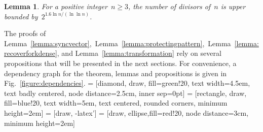 \documentclass[10pt,a4paper,onecolumn]{IEEEtran}
\newtheorem{lemma}{Lemma}
\newcommand{\1}{\mathbbold{1}}
\begin{document}
\begin{lemma}\label{lemma:numberofdivisors}
For a positive integer~$n\ge 3$, the number of divisors of~$n$ is upper bounded by~$2^{1.6\ln n/(\ln \ln n)}$.
\end{lemma}
The proofs of Lemma~\ref{lemma:syncvector},~Lemma~\ref{lemma:protectingpattern},~Lemma~\ref{lemma:recoverforkdense}, and Lemma~\ref{lemma:transformation} rely on several propositions that will be presented in the next sections. For convenience, a dependency graph for the theorem, lemmas and propositions is given in Fig.~\ref{figure:dependencies}.  
 = [diamond, draw, fill=green!20, text width=4.5em, text badly centered, node distance=2.5cm, inner sep=0pt]
 = [rectangle, draw, fill=blue!20, text width=5em, text centered, rounded corners, minimum height=2em]
 = [draw, -latex']
 = [draw, ellipse,fill=red!20, node distance=3cm, minimum height=2em]
\end{document}
